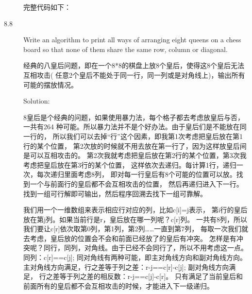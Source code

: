 \begin{description}
完整代码如下：



\item[8.8] Write an algorithm to print all ways of arranging eight queens on a chess board so that none of them share the same row, column or diagonal.

经典的八皇后问题，即在一个8*8的棋盘上放8个皇后，使得这8个皇后无法互相攻击( 任意2个皇后不能处于同一行，同一列或是对角线上)，输出所有可能的摆放情况。

Solution: 

8皇后是个经典的问题，如果使用暴力法，每个格子都去考虑放皇后与否，一共有264 种可能。所以暴力法并不是个好办法。由于皇后们是不能放在同一行的， 所以我们可以去掉“行”这个因素，即我第1次考虑把皇后放在第1行的某个位置， 第2次放的时候就不用去放在第一行了，因为这样放皇后间是可以互相攻击的。 第2次我就考虑把皇后放在第2行的某个位置，第3次我考虑把皇后放在第3行的某个位置， 这样依次去递归。每计算1行，递归一次，每次递归里面考虑8列， 即对每一行皇后有8个可能的位置可以放。找到一个与前面行的皇后都不会互相攻击的位置， 然后再递归进入下一行。找到一组可行解即可输出，然后程序回溯去找下一组可靠解。

我们用一个一维数组来表示相应行对应的列，比如c[i]=j表示， 第i行的皇后放在第j列。如果当前行是r，皇后放在哪一列呢？c[r]列。 一共有8列，所以我们要让c[r]依次取第0列，第1列，第2列……一直到第7列， 每取一次我们就去考虑，皇后放的位置会不会和前面已经放了的皇后有冲突。 怎样是有冲突呢？同行，同列，对角线。由于已经不会同行了，所以不用考虑这一点。 同列：c[r]==c[j]; 同对角线有两种可能，即主对角线方向和副对角线方向。 主对角线方向满足，行之差等于列之差：r-j==c[r]-c[j]; 副对角线方向满足， 行之差等于列之差的相反数：r-j==c[j]-c[r]。 只有满足了当前皇后和前面所有的皇后都不会互相攻击的时候，才能进入下一级递归。


\end{description}
